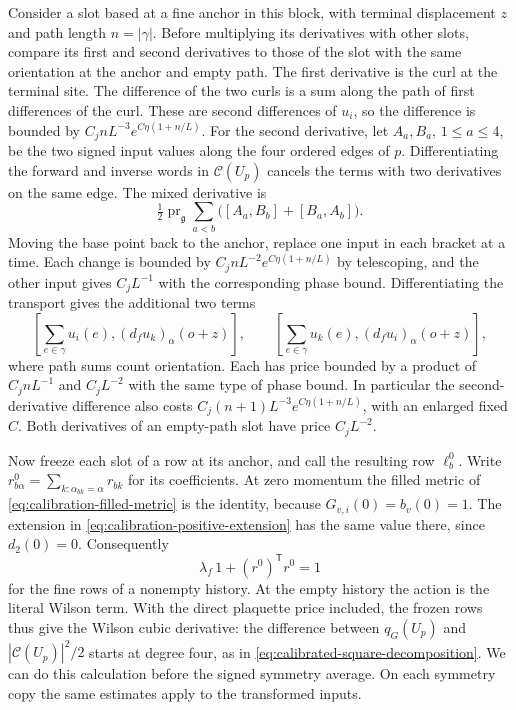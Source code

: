 \documentclass[11pt,reqno]{amsart}
\numberwithin{equation}{section}
\theoremstyle{definition}
\theoremstyle{remark}
\newcommand{\g}{\mathfrak g}
\begin{document}
Consider a slot based at a fine anchor in this block, with
terminal displacement \(z\) and path length \(n=|\gamma|\).
Before multiplying its derivatives with other slots, compare
its first and second derivatives to those of the slot with
the same orientation at the anchor and empty path. The
first derivative is the curl at the terminal site. The
difference of the two curls is a sum along the path of
first differences of the curl. These are second
differences of \(u_i\), so the difference is bounded by
\(C_j n L^{-3}e^{C\eta(1+n/L)}\).
For the second derivative, let \(A_a,B_a\), \(1\le a\le4\),
be the two signed input values along the four ordered
edges of \(p\). Differentiating the forward and inverse
words in \(\mathcal C(U_p)\) cancels the terms with two
derivatives on the same edge. The mixed derivative is
\[
 \tfrac12\operatorname{pr}_{\g}
     \sum_{a<b}\bigl([A_a,B_b]+[B_a,A_b]\bigr).
\]
Moving the base point back to the anchor, replace one
input in each bracket at a time. Each change
is bounded by \(C_j n L^{-2}e^{C\eta(1+n/L)}\) by
telescoping, and the other input gives \(C_jL^{-1}\)
with the corresponding phase bound. Differentiating the
transport gives the additional two terms
\[
 \left[\sum_{e\in\gamma} u_i(e),(d_fu_k)_\alpha(o+z)\right],
 \qquad
 \left[\sum_{e\in\gamma} u_k(e),(d_fu_i)_\alpha(o+z)\right],
\]
where path sums count orientation. Each has price bounded by
a product of \(C_jnL^{-1}\) and \(C_jL^{-2}\) with the same
type of phase bound. In particular the second-derivative
difference also costs \(C_j(n+1)L^{-3}e^{C\eta(1+n/L)}\),
with an enlarged fixed \(C\). Both derivatives of an
empty-path slot have price \(C_jL^{-2}\).

Now freeze each slot of a row at its anchor, and call the
resulting row \(\ell_b^0\). Write
\(r^0_{b\alpha}=\sum_{k:\alpha_{bk}=\alpha}r_{bk}\)
for its coefficients. At zero momentum the filled metric
of \eqref{eq:calibration-filled-metric} is the identity,
because \(G_{v,i}(0)=b_v(0)=1\). The extension in
\eqref{eq:calibration-positive-extension} has the same
value there, since \(d_2(0)=0\). Consequently
\[
                  \lambda_f\,1+(r^0)^{\mathsf T}r^0=1
\]
for the fine rows of a nonempty history. At the empty
history the action is the literal Wilson term. With the
direct plaquette price included, the frozen rows thus
give the Wilson cubic derivative: the difference between
\(q_G(U_p)\) and \(|\mathcal C(U_p)|^2/2\) starts at
degree four, as in \eqref{eq:calibrated-square-decomposition}.
We can do this calculation before the signed symmetry
average. On each symmetry copy the same estimates apply
to the transformed inputs.
\end{document}

